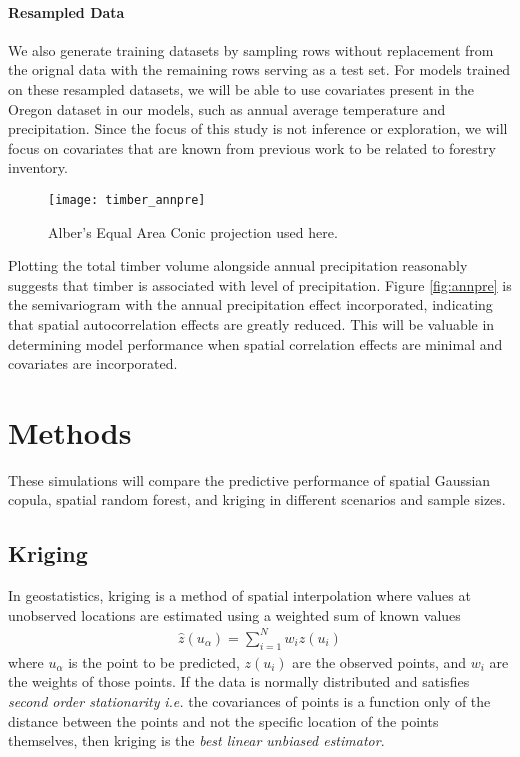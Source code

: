 \documentclass{article}
\begin{document}
\paragraph{Resampled Data} We also generate training datasets by sampling rows without replacement from the orignal data with the remaining rows serving as a test set.
For models trained on these resampled datasets, we will be able to use covariates present in the Oregon dataset in our models, such as annual average temperature and precipitation.
Since the focus of this study is not inference or exploration, we will focus on covariates that are known from previous work\cite{madsen09} to be related to forestry inventory.

\begin{center}
	\begin{figure}[ht]
		\texttt{[image: timber\_annpre]}
		\caption{Alber's Equal Area Conic projection used here.}
	\end{figure}
\end{center}
\vspace{-1cm}

Plotting the total timber volume alongside annual precipitation reasonably suggests that timber is associated with level of precipitation.
Figure \ref{fig:annpre} is the semivariogram with the annual precipitation effect incorporated, indicating that spatial autocorrelation effects are greatly reduced.
This will be valuable in determining model performance when spatial correlation effects are minimal and covariates are incorporated.

\section{Methods}
These simulations will compare the predictive performance of spatial Gaussian copula, spatial random forest, and kriging in different scenarios and sample sizes.

\subsection{Kriging}
In geostatistics, kriging is a method of spatial interpolation where values at unobserved locations are estimated using a weighted sum of known values
\begin{align*}
	\hat{z}(u_\alpha) = \sum_{i=1}^{N} w_i z(u_i)
\end{align*}
where $u_\alpha$ is the point to be predicted, $z(u_i)$ are the observed points, and $w_i$ are the weights of those points.
If the data is normally distributed and satisfies \textit{second order stationarity} \textit{i.e.} the covariances of points is a function only of the distance between the points and not the specific location of the points themselves, then kriging is the \textit{best linear unbiased estimator}\cite{cressie93}.
\end{document}
